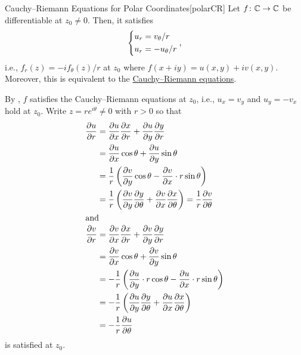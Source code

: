 \documentclass[../complex_variables_1.tex]{subfiles}
\begin{document}
\begin{Theorem}{Cauchy--Riemann Equations for Polar Coordinates}[polarCR]
    Let \(f \colon \CC \to \CC\) be differentiable at \(z_0 \neq 0\).
    Then, it satisfies
    \[
        \left\{\begin{aligned}[c]
                u_r &= v_\theta/r \\
                u_r &= -u_\theta/r
        \end{aligned}\right.\text,
    \]
    i.e., \(f_r(z) = -if_\theta(z)/r\) at \(z_0\) where \(f(x+iy) = u(x,y)+iv(x,y)\).
    Moreover, this is equivalent to the \hyperlink{dfn:cauchyRiemann}{Cauchy--Riemann equations}.
\end{Theorem}
\begin{myproof}[Proof]
    By , \(f\) satisfies the Cauchy--Riemann equations at \(z_0\),
    i.e., \(u_x = v_y\) and \(u_y = -v_x\) hold at \(z_0\).
    Write \(z = re^{i\theta} \neq 0\) with \(r > 0\) so that
    \begin{align*}
        \frac{\partial u}{\partial r}
        &= \frac{\partial u}{\partial x}\frac{\partial x}{\partial r} + \frac{\partial u}{\partial y}\frac{\partial y}{\partial r} \\
        &= \frac{\partial u}{\partial x} \cos\theta + \frac{\partial u}{\partial y} \sin\theta \\
        &= \frac{1}{r} \left(\frac{\partial v}{\partial y} \cos\theta - \frac{\partial v}{\partial x} \cdot r \sin\theta\right) \\
        &= \frac{1}{r} \left(\frac{\partial v}{\partial y}\frac{\partial y}{\partial \theta} + \frac{\partial v}{\partial x}\frac{\partial x}{\partial\theta}\right)
        = \frac{1}{r} \frac{\partial v}{\partial \theta} \\
        \shortintertext{and}
        \frac{\partial v}{\partial r}
        &= \frac{\partial v}{\partial x}\frac{\partial x}{\partial r} + \frac{\partial v}{\partial y}\frac{\partial y}{\partial r} \\
        &= \frac{\partial v}{\partial x} \cos\theta + \frac{\partial v}{\partial y} \sin\theta \\
        &= -\frac{1}{r} \left(\frac{\partial u}{\partial y} \cdot r \cos\theta - \frac{\partial u}{\partial x} \cdot r \sin\theta\right) \\
        &= -\frac{1}{r} \left(\frac{\partial u}{\partial y}\frac{\partial y}{\partial \theta} + \frac{\partial u}{\partial x}\frac{\partial x}{\partial\theta}\right) \\
        &= -\frac{1}{r} \frac{\partial u}{\partial \theta}
    \end{align*}
    is satisfied at \(z_0\).
 

\end{myproof}
\end{document}
